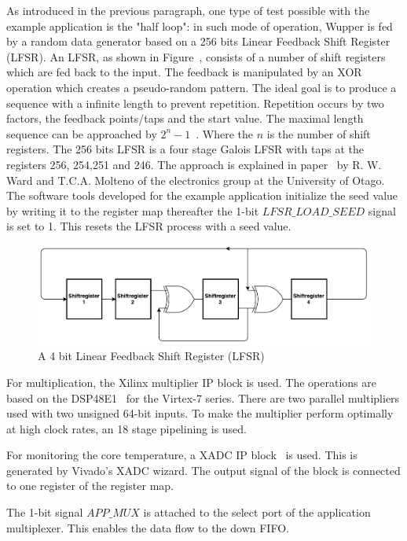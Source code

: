 \newpage
As introduced in the previous paragraph, one type of test possible with the example application is the "half loop": in such mode of operation, Wupper is fed by a random data generator based on a 256 bits Linear Feedback Shift Register (LFSR). An LFSR, as shown in Figure~\cite{lfsr}, consists of a number of shift registers which are fed back to the input. The feedback is manipulated by an XOR operation which creates a pseudo-random pattern. The ideal goal is to produce a sequence with a infinite length to prevent repetition. Repetition occurs by two factors, the feedback points/taps and the start value. The maximal length sequence can be approached by $2^n-1$~\cite{lfsr}. Where the $n$ is the number of shift registers. The 256 bits LFSR is a four stage Galois LFSR with taps at the registers 256, 254,251 and 246. The approach is explained in paper~\cite{lfsrtable} by R. W. Ward and T.C.A. Molteno of the electronics group at the University of Otago.
The software tools developed for the example application initialize the seed value by writing it to the register map thereafter the 1-bit $LFSR\_LOAD\_SEED$ signal is set to 1. This resets the LFSR process with a seed value.

\begin{figure}[h]
	\centering
	\includegraphics[width = 0.8 \textwidth]{figures/lfsr.pdf}	
	\caption{A 4 bit Linear Feedback Shift Register (LFSR)}
	\label{fig:lfsr}
\end{figure}
\newpage
For multiplication, the Xilinx multiplier IP block is used. The operations are based on the DSP48E1~\cite{DSP84E1} for the Virtex-7 series. There are two parallel multipliers used with two unsigned 64-bit inputs. To make the multiplier perform optimally at high clock rates, an 18 stage pipelining is used.

For monitoring the core temperature, a XADC IP block~\cite{xadc} is used. This is generated by Vivado's XADC wizard. The output signal of the block is connected to one register of the register map.

The 1-bit signal $APP\_MUX$ is attached to the select port of the application multiplexer. This enables the data flow to the down FIFO.


